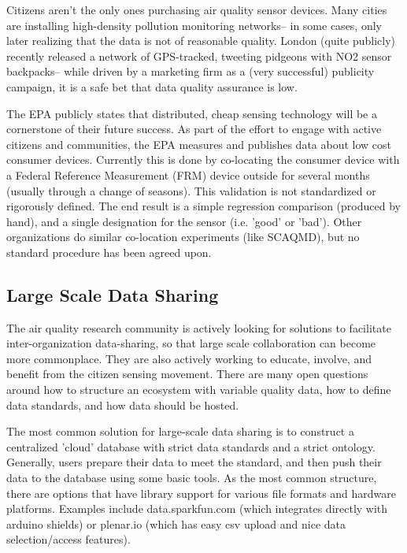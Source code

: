 Citizens aren't the only ones purchasing air quality sensor devices.  Many cities are installing high-density pollution monitoring networks-- in some cases, only later realizing that the data is not of reasonable quality.  London (quite publicly) recently released a network of GPS-tracked, tweeting pidgeons with NO2 sensor backpacks-- while driven by a marketing firm as a (very successful) publicity campaign, it is a safe bet that data quality assurance is low.

The EPA publicly states that distributed, cheap sensing technology will be a cornerstone of their future success.  As part of the effort to engage with active citizens and communities, the EPA measures and publishes data about low cost consumer devices.  Currently this is done by co-locating the consumer device with a Federal Reference Measurement (FRM) device outside for several months (usually through a change of seasons).  This validation is not standardized or rigorously defined.  The end result is a simple regression comparison (produced by hand), and a single designation for the sensor (i.e. 'good' or 'bad').  Other organizations do similar co-location experiments (like SCAQMD), but no standard procedure has been agreed upon.

\subsection{Large Scale Data Sharing}

The air quality research community is actively looking for solutions to facilitate inter-organization data-sharing, so that large scale collaboration can become more commonplace.  They are also actively working to educate, involve, and benefit from the citizen sensing movement.  There are many open questions around how to structure an ecosystem with variable quality data, how to define data standards, and how data should be hosted. 
 
The most common solution for large-scale data sharing is to construct a centralized 'cloud' database with strict data standards and a strict ontology.  Generally, users prepare their data to meet the standard, and then push their data to the database using some basic tools.  As the most common structure, there are options that have library support for various file formats and hardware platforms.  Examples include data.sparkfun.com (which integrates directly with arduino shields) or plenar.io (which has easy csv upload and nice data selection/access features).  


